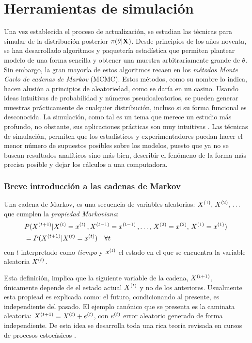 \documentclass[../Main/Main.tex]{subfiles}
\begin{document}
\section{Herramientas de simulación} \label{sec:GibbsSampler}
Una vez establecida el proceso de actualización, se estudian las técnicas para simular de la distribución posterior $\pi(\theta|\mathbf{X})$. Desde principios de los años noventa, se han desarrollado algoritmos y paquetería estadística que permiten plantear modelo de una forma sencilla y obtener una muestra arbitrariamente grande de $\theta$. Sin embargo, la gran mayoría de estos algoritmos recaen en los \textit{métodos Monte Carlo de cadenas de Markov} (MCMC). Estos métodos, como su nombre lo indica, hacen alusión a principios de aleatoriedad, como se daría en un casino. Usando ideas intuitivas de probabilidad y números pseudoaleatorios, se pueden generar muestras prácticamente de cualquier distribución, incluso si su forma funcional es desconocida. La simulación, como tal es un tema que merece un estudio más profundo, no obstante, sus aplicaciones prácticas son muy intuitivas \autocite{robert2004monte}. Las técnicas de simulación, permiten que los estadísticos y experimentadores puedan hacer el menor número de supuestos posibles sobre los modelos, puesto que ya no se buscan resultados analíticos sino más bien, describir el fenómeno de la forma más precisa posible y dejar los cálculos a una computadora.

\subsubsection*{Breve introducción a las cadenas de Markov}
\begin{definition}
Una cadena de Markov, es una secuencia de variables aleatorias: $X^{(1)},\,X^{(2)},\,\ldots$ que cumplen la \textit{propiedad Markoviana}:
\begin{align*}
&P(X^{(t+1)}|X^{(t)} = x^{(t)}\, ,X^{(t-1)} = x^{(t-1)}\,,\ldots,\,X^{(2)} = x^{(2)},\,X^{(1)} = x^{(1)}) \\
&= P(X^{(t+1)}|X^{(t)} = x^{(t)}) \quad\forall t
\end{align*}
con $t$ interpretado como \textit{tiempo} y $x^{(t)}$ el estado en el que se encuentra la variable aleatoria $X^{(t)}$.
\end{definition}
Esta definición, implica que la siguiente variable de la cadena, $X^{(t+1)}$, únicamente depende de el estado actual $X^{(t)}$ y no de los anteriores. Usualmente esta propiead es explicada como: el futuro, condicionando al presente, es independiente del pasado. El ejemplo canónico que se presenta es la caminata aleatoria: $X^{(t+1)} = X^{(t)} + e^{(t)}$, con $e^{(t)}$ error aleatorio generado de forma independiente. De esta idea se desarrolla toda una rica teoría revisada en cursos de procesos estocásicos \citet{ross2009introduction}. 
\end{document}
